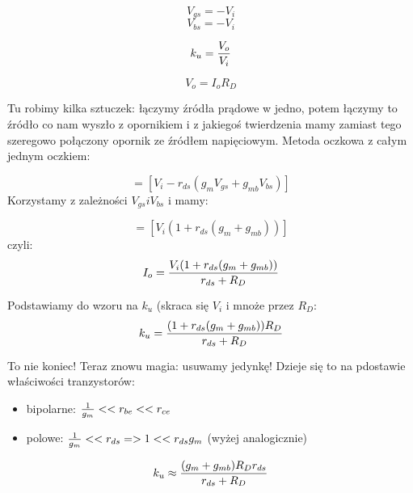 \documentclass[10pt,a4paper]{article}
\begin{document}
\begin{equation}
V_{gs} = -V_i
\end{equation}
\begin{equation}
V_{bs} = -V_i
\end{equation}

\begin{equation}
k_u = {V_o \over V_i}
\end{equation}

\begin{equation}
V_o = I_o R_D
\end{equation}

Tu robimy kilka sztuczek: łączymy źródła prądowe w jedno, potem łączymy to źródło co nam wyszło z opornikiem i z jakiegoś twierdzenia mamy zamiast tego szeregowo połączony opornik ze źródłem napięciowym. Metoda oczkowa z całym jednym oczkiem:

\begin{equation}
[r_{ds} + R_D][i_o]=[V_i - r_{ds}(g_mV_{gs} + g_{mb}V_{bs})]
\end{equation}
Korzystamy z zależności $V_{gs} i V_{bs}$ i mamy:

\begin{equation}
[r_{ds} + R_D][i_o]=[V_i (1 + r_{ds}(g_m + g_{mb}))]
\end{equation}
czyli:\\
\begin{equation}
I_o = {V_i(1+r_{ds}(g_m + g_{mb}))\over r_{ds} + R_D}
\end{equation}

Podstawiamy do wzoru na $k_u$ (skraca się $V_i$ i mnoże przez $R_D$:\\
\begin{equation}
k_u = {(1+r_{ds}(g_m + g_{mb}))R_D\over r_{ds} + R_D}
\end{equation}

To nie koniec! Teraz znowu magia: usuwamy jedynkę! Dzieje się to na pdostawie właściwości tranzystorów:\\
\begin{itemize}
\item bipolarne: ${1 \over g_m }<< r_{be} << r_{ce}$
\item polowe: ${1 \over g_m }<< r_{ds} => 1 << r_{ds}g_m$ (wyżej analogicznie)
\end{itemize}

\begin{equation}
k_u \approx {(g_m + g_{mb})R_Dr_{ds}\over r_{ds} + R_D}
\end{equation}
\end{document}
